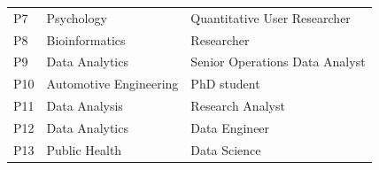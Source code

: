 {\begin{table}[ht]
\begin{tabular}{l|l|l}
            P7 & Psychology & Quantitative User Researcher \\ %
            P8 & Bioinformatics  & Researcher  \\ %
            P9 & Data Analytics & Senior Operations Data Analyst \\ %
            P10 & Automotive Engineering & PhD student \\ %
            P11 & Data Analysis & Research Analyst \\ %
            P12 & Data Analytics & Data Engineer \\ %
            P13 & Public Health & Data Science \\ %
        \end{tabular}
    \label{tab:summativeEvaluationParticipants}
  \end{table}
}

\newcommand{\mysmaller}{\fontsize{9pt}{9pt}\selectfont}
\newcommand{\smalltt}[1]{{\mysmaller \texttt{#1}}}

